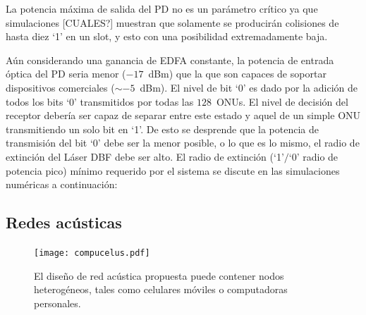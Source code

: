 La potencia máxima de salida del PD no es un parámetro crítico ya que simulaciones [CUALES?] muestran que solamente se producirán colisiones de hasta diez `1' en un slot, y esto con una posibilidad extremadamente baja.

Aún considerando una ganancia de EDFA constante, la potencia de entrada óptica del PD seria menor ($-17$~dBm) que la que son capaces de soportar dispositivos comerciales ($\sim -5$~dBm).
El nivel de bit `0' es dado por la adición de todos los bits `0' transmitidos por todas las $128$~ONUs.
El nivel de decisión del receptor debería ser capaz de separar entre este estado y aquel de un simple ONU transmitiendo un solo bit en `1'.
De esto se desprende que la potencia de transmisión del bit `0' debe ser la menor posible, o lo que es lo mismo, el radio de extinción del Láser DBF debe ser alto.
El radio de extinción (`1'$/$`0' radio de potencia pico) mínimo requerido por el sistema se discute en las simulaciones numéricas a continuación:


\subsection{Redes acústicas}
\begin{figure}[!t]
  \centering
    \texttt{[image: compucelus.pdf]}
    \caption{El diseño de red acústica propuesta puede contener nodos heterogéneos, tales como celulares móviles o computadoras personales.}
    \label{arch:chain}
\end{figure}

